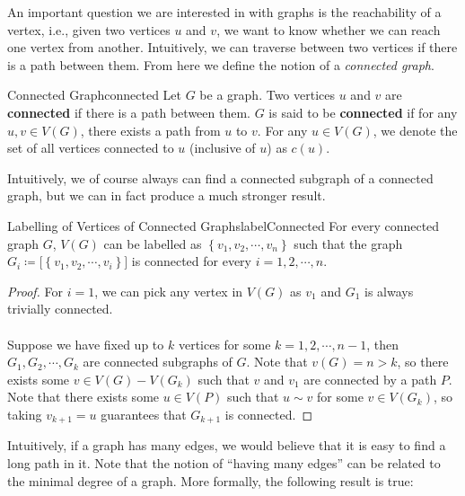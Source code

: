 \documentclass[math, code]{amznotes}
\theoremstyle{remark}
\begin{document}
An important question we are interested in with graphs is the reachability of a vertex, i.e., given two vertices $u$ and $v$, we want to know whether we can reach one vertex from another. Intuitively, we can traverse between two vertices if there is a path between them. From here we define the notion of a \textit{connected graph}.
\begin{dfnbox}{Connected Graph}{connected}
    Let $G$ be a graph. Two vertices $u$ and $v$ are {\color{red} \textbf{connected}} if there is a path between them. $G$ is said to be {\color{red} \textbf{connected}} if for any $u, v \in V(G)$, there exists a path from $u$ to $v$. For any $u \in V(G)$, we denote the set of all vertices connected to $u$ (inclusive of $u$) as $c(u)$.
\end{dfnbox}
Intuitively, we of course always can find a connected subgraph of a connected graph, but we can in fact produce a much stronger result.
\begin{probox}{Labelling of Vertices of Connected Graphs}{labelConnected}
    For every connected graph $G$, $V(G)$ can be labelled as $\left\{v_1, v_2, \cdots, v_n\right\}$ such that the graph~$G_i \coloneqq \bigl[\left\{v_1, v_2, \cdots, v_i\right\}\bigr]$ is connected for every $i = 1, 2, \cdots, n$.
    \tcblower
    \begin{proof}
        For $i = 1$, we can pick any vertex in $V(G)$ as $v_1$ and $G_1$ is always trivially connected.
        \\\\
        Suppose we have fixed up to $k$ vertices for some $k = 1, 2, \cdots, n - 1$, then $G_1, G_2, \cdots, G_k$ are connected subgraphs of $G$. Note that $v(G) = n > k$, so there exists some $v \in V(G) - V(G_k)$ such that $v$ and $v_1$ are connected by a path $P$. Note that there exists some $u \in V(P)$ such that $u \sim v$ for some $v \in V(G_k)$, so taking $v_{k + 1} = u$ guarantees that $G_{k + 1}$ is connected.
    \end{proof}
\end{probox}
Intuitively, if a graph has many edges, we would believe that it is easy to find a long path in it. Note that the notion of ``having many edges'' can be related to the minimal degree of a graph. More formally, the following result is true:
\end{document}
